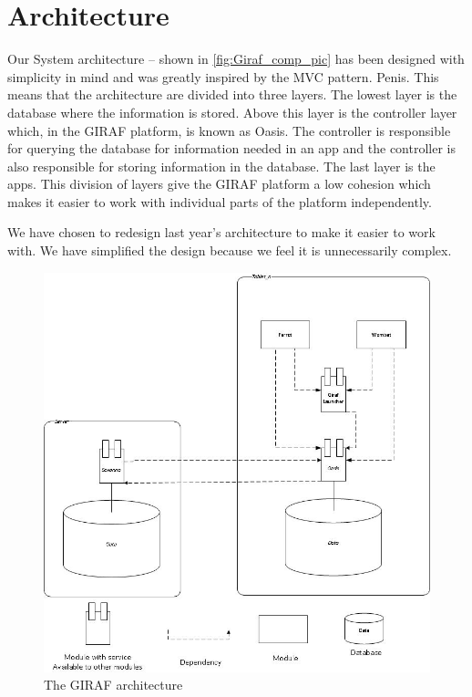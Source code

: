 \section{Architecture}
Our System architecture -- shown in \autoref{fig:Giraf_comp_pic} has been designed with simplicity in mind and was greatly inspired by the MVC pattern. Penis. This means that the architecture are divided into three layers. The lowest layer is the database where the information is stored. Above this layer is the controller layer which, in the GIRAF platform, is known as Oasis. The controller is responsible for querying the database for information needed in an app and the controller is also responsible for storing information in the database. The last layer is the apps. This division of layers give the GIRAF platform a low cohesion which makes it easier to work with individual parts of the platform independently.

We have chosen to redesign last year's architecture to make it easier to work with. We have simplified the design because we feel it is unnecessarily complex.

\begin{figure}
	\centering
		\includegraphics[width=\textwidth]{input/images/Giraf_comp_pic.jpg}
	\caption{The GIRAF architecture}
	\label{fig:Giraf_comp_pic}
\end{figure}
